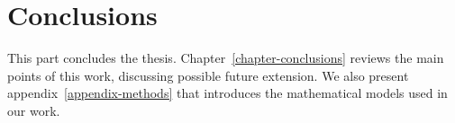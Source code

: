 \part{Conclusions} %

\label{part:conclusions} %


This part concludes the thesis. Chapter~\ref{chapter-conclusions} reviews the main points of this work, discussing possible future extension. We also present appendix~\ref{appendix-methods} that introduces the mathematical models used in our work.


 
